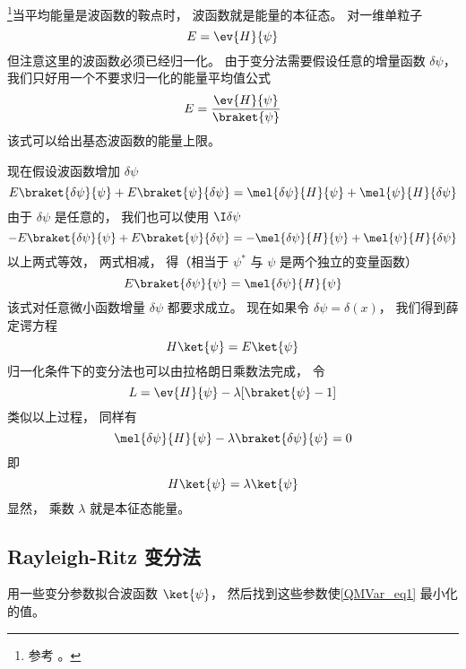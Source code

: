 

\footnote{参考 \cite{Bransden}。}当平均能量是波函数的鞍点时， 波函数就是能量的本征态。 对一维单粒子
\begin{equation}
E = \ev{H}{\psi}
\end{equation}
但注意这里的波函数必须已经归一化。 由于变分法需要假设任意的增量函数 $\delta \psi $，  我们只好用一个不要求归一化的能量平均值公式
\begin{equation}\label{QMVar_eq1}
E = \frac{\ev{H}{\psi}}{\braket{\psi}}
\end{equation}
该式可以给出基态波函数的能量上限。

现在假设波函数增加 $\delta \psi$ 
\begin{equation}
E \braket{\delta\psi}{\psi} + E\braket{\psi}{\delta\psi}
= \mel{\delta \psi}{H}{\psi} + \mel{\psi}{H}{\delta\psi}
\end{equation}
由于 $\delta\psi$ 是任意的， 我们也可以使用 $\I\delta\psi$ 
\begin{equation}
-E \braket{\delta\psi}{\psi} + E \braket{\psi}{\delta\psi}
= -\mel{\delta\psi}{H}{\psi} + \mel{\psi}{H}{\delta\psi}
\end{equation}
以上两式等效， 两式相减， 得（相当于 $\psi^*$ 与 $\psi$ 是两个独立的变量函数）
\begin{equation}
E\braket{\delta\psi}{\psi} = \mel{\delta\psi}{H}{\psi}
\end{equation}
该式对任意微小函数增量 $\delta\psi $ 都要求成立。 现在如果令 $\delta \psi  = \delta (x)$，  我们得到薛定谔方程
\begin{equation}
H \ket{\psi} = E\ket{\psi}
\end{equation}
归一化条件下的变分法也可以由拉格朗日乘数法完成， 令
\begin{equation}
L = \ev{H}{\psi} - \lambda [\braket{\psi} - 1]
\end{equation}
类似以上过程， 同样有
\begin{equation}
\mel{\delta\psi}{H}{\psi} - \lambda\braket{\delta\psi}{\psi} = 0
\end{equation}
即
\begin{equation}
H \ket{\psi} = \lambda \ket{\psi}
\end{equation}
显然， 乘数 $\lambda $ 就是本征态能量。

\subsection{Rayleigh-Ritz 变分法}
用一些变分参数拟合波函数 $\ket{\psi}$， 然后找到这些参数使\autoref{QMVar_eq1} 最小化的值。

